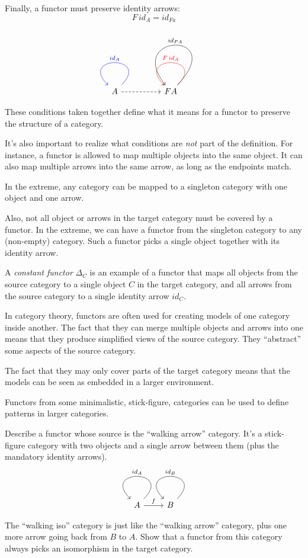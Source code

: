 \documentclass[DaoFP]{subfiles}
\begin{document}
Finally, a functor must preserve identity arrows:
\[ F\, id_A = id_{F a} \]

\[
 \begin{tikzcd}
 A 
  \arrow[loop, blue,  "id_A"']
\arrow[rr, dashed]
 && F A
  \arrow[loop, red, "F \, id_{A}"']
  \arrow[loop, controls={+(2.5, 2.6) and +(-2, 2.5)}, "id_{F A}"']
  \end{tikzcd}
\]

These conditions taken together define what it means for a functor to preserve the structure of a category.

It's also important to realize what conditions are \emph{not} part of the definition. For instance, a functor is allowed to map multiple objects into the same object. It can also map multiple arrows into the same arrow, as long as the endpoints match. 

In the extreme, any category can be mapped to a singleton category with one object and one arrow.

Also, not all object or arrows in the target category must be covered by a functor. In the extreme, we can have a functor from the singleton category to any (non-empty) category. Such a functor picks a single object together with its identity arrow.

A \emph{constant functor} $\Delta_C$ is an example of a functor that maps all objects from the source category to a single object $C$ in the target category, and all arrows from the source category to a single identity arrow $id_C$.

In category theory, functors are often used for creating models of one category inside another. The fact that they can merge multiple objects and arrows into one means that they produce simplified views of the source category. They ``abstract'' some aspects of the source category.

The fact that they may only cover parts of the target category means that the models can be seen as embedded in a larger environment.

Functors from some minimalistic, stick-figure, categories can be used to define patterns in larger categories.

\begin{exercise}
Describe a functor whose source is the ``walking arrow'' category. It's a stick-figure category with two objects and a single arrow between them (plus the mandatory identity arrows).
\[
 \begin{tikzcd}
 A 
  \arrow[loop,  "id_A"']
\arrow[r, "f"]
 & B
  \arrow[loop, "id_{B}"']
  \end{tikzcd}
\]
\end{exercise}
\begin{exercise}
The ``walking iso'' category is just like the ``walking arrow'' category, plus one more arrow going back from $B$ to $A$. Show that a functor from this category always picks an isomorphism in the target category. 
\end{exercise}
\end{document}
